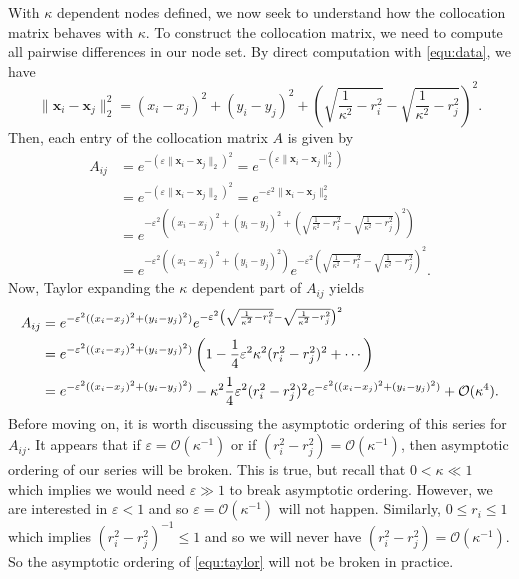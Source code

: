\documentclass[a4paper,11pt]{article}
\newcommand{\eps}{\varepsilon}
\newcommand{\norm}[1]{\lVert #1 \rVert}
\newcommand{\bigO}{\mathcal{O}}
\newcommand{\bx}{\mathbf{x}}
\begin{document}
With $ \kappa $ dependent nodes defined, we now seek to understand how the collocation matrix behaves with $ \kappa $. To construct the collocation matrix, we need to compute all pairwise differences in our node set. By direct computation with \eqref{equ:data}, we have
\begin{equation}
	\norm{\bx_i - \bx_j}_2^2 = (x_i - x_j)^2 + (y_i - y_j)^2 + \left(\sqrt{\frac{1}{\kappa^2} - r_i^2} - \sqrt{\frac{1}{\kappa^2} - r_j^2}\right)^2. \label{equ:diff}
\end{equation}
Then, each entry of the collocation matrix $ A $ is given by
\begin{align*}
	A_{ij} &= e^{-(\eps \norm{\bx_i - \bx_j}_2)^2} = e^{-(\eps \norm{\bx_i - \bx_j}_2^2)} \\
	&= e^{-(\eps \norm{\mathbf{x}_i - \mathbf{x}_j}_2)^2} = e^{-\eps^2 \norm{\mathbf{x}_i - \mathbf{x}_j}_2^2} \\
	&= e^{-\eps^2 \left((x_i - x_j)^2 + (y_i - y_j)^2 + \left(\sqrt{\frac{1}{\kappa^2} - r_i^2} - \sqrt{\frac{1}{\kappa^2} - r_j^2}\right)^2\right)} \\
	&= e^{-\eps^2((x_i - x_j)^2 + (y_i - y_j)^2)} e^{-\eps^2 \left(\sqrt{\frac{1}{\kappa^2} - r_i^2} - \sqrt{\frac{1}{\kappa^2} - r_j^2}\right)^2}.
\end{align*}
Now, Taylor expanding the $ \kappa $ dependent part of $ A_{ij} $ yields
\begin{align}
	A_{ij} &= e^{-\eps^2((x_i - x_j)^2 + (y_i - y_j)^2)} e^{-\eps^2 \left(\sqrt{\frac{1}{\kappa^2} - r_i^2} - \sqrt{\frac{1}{\kappa^2} - r_j^2}\right)^2} \notag \\
	&= e^{-\eps^2((x_i - x_j)^2 + (y_i - y_j)^2)} \left(1 - \frac{1}{4} \eps^2 \kappa^2 (r_i^2 - r_j^2)^2 + \cdots\right) \notag \\
	&= e^{-\eps^2((x_i - x_j)^2 + (y_i - y_j)^2)} - \kappa^2 \frac{1}{4} \eps^2 (r_i^2 - r_j^2)^2 e^{-\eps^2((x_i - x_j)^2 + (y_i - y_j)^2)} + \bigO(\kappa^4). \label{equ:taylor}
\end{align}
Before moving on, it is worth discussing the asymptotic ordering of this series for $ A_{ij} $. It appears that if $ \eps = \bigO(\kappa^{-1}) $ or if $ (r_i^2 - r_j^2) = \bigO(\kappa^{-1}) $, then asymptotic ordering of our series will be broken. This is true, but recall that $ 0 < \kappa \ll 1 $ which implies we would need $ \eps \gg 1 $ to break asymptotic ordering. However, we are interested in $ \eps < 1 $ and so $ \eps = \bigO(\kappa^{-1}) $ will not happen. Similarly, $ 0 \leq r_i \leq 1 $ which implies $ (r_i^2 - r_j^2)^{-1} \leq 1 $ and so we will never have $ (r_i^2 - r_j^2) = \bigO(\kappa^{-1}) $. So the asymptotic ordering of \eqref{equ:taylor} will not be broken in practice.
\end{document}
